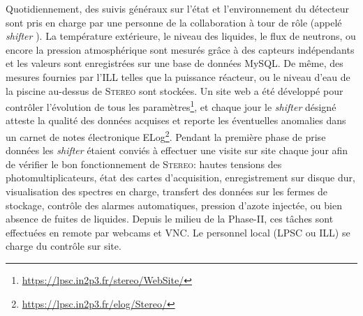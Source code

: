 Quotidiennement, des suivis généraux sur l'état et l'environnement du détecteur sont pris en charge par une personne de la collaboration à tour de rôle (appelé \og \textit{shifter} \fg{}). La température extérieure, le niveau des liquides, le flux de neutrons, ou encore la pression atmosphérique sont mesurés grâce à des capteurs indépendants et les valeurs sont enregistrées sur une base de données MySQL. De même, des mesures fournies par l'ILL telles que la puissance réacteur, ou le niveau d'eau de la piscine au-dessus de \textsc{Stereo} sont stockées. Un site web a été développé pour contrôler l'évolution de tous les paramètres\footnote{\url{https://lpsc.in2p3.fr/stereo/WebSite/}}, et chaque jour le \textit{shifter} désigné atteste la qualité des données acquises et reporte les éventuelles anomalies dans un carnet de notes électronique ELog\footnote{\url{https://lpsc.in2p3.fr/elog/Stereo/}}. Pendant la première phase de prise données les \textit{shifter} étaient conviés à effectuer une visite sur site chaque jour afin de vérifier le bon fonctionnement de \textsc{Stereo}: hautes tensions des photomultiplicateurs, état des cartes d'acquisition, enregistrement sur disque dur, visualisation des spectres en charge, transfert des données sur les fermes de stockage, contrôle des alarmes automatiques, pression d'azote injectée, ou bien absence de fuites de liquides. Depuis le milieu de la Phase-II, ces tâches sont effectuées en remote par webcams et VNC. Le personnel local (LPSC ou ILL) se charge du contrôle sur site.\\ 

